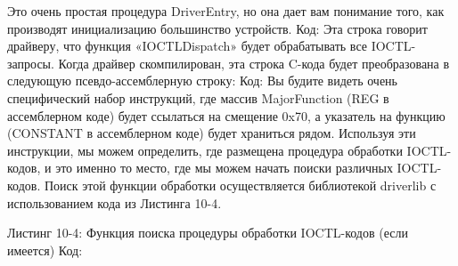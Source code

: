 \documentclass[12pt, a4paper, oneside]{book}
\begin{document}








Это очень простая процедура DriverEntry, но она дает вам понимание того, как производят инициализацию большинство устройств. 
Код:
Эта строка говорит драйверу, что функция «IOCTLDispatch» будет обрабатывать все IOCTL-запросы. Когда драйвер скомпилирован, эта строка C-кода будет преобразована в следующую псевдо-ассемблерную строку: 
Код:
Вы будите видеть очень специфический набор инструкций, где массив MajorFunction (REG в ассемблерном коде) будет ссылаться на смещение 0x70, а указатель на функцию (CONSTANT в ассемблерном коде) будет храниться рядом. Используя эти инструкции, мы можем определить, где размещена процедура обработки IOCTL-кодов, и это именно то место, где мы можем начать поиски различных IOCTL-кодов. Поиск этой функции обработки осуществляется библиотекой driverlib с использованием кода из Листинга 10-4. 

Листинг 10-4: Функция поиска процедуры обработки IOCTL-кодов (если имеется)
Код:


\end{document}
